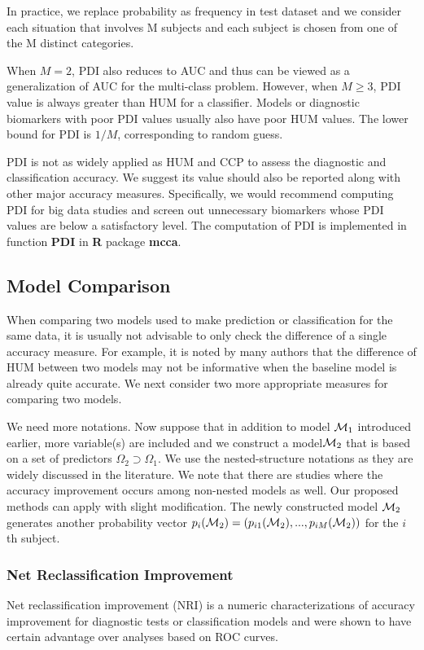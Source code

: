 \documentclass[]{article}
\begin{document}
In practice, we replace probability as frequency in test dataset and we consider each situation that involves M subjects
and each subject is chosen from one of the M distinct categories.

When $M=2$, PDI also reduces to AUC and thus can be viewed as a generalization of AUC for the multi-class problem. However, when $M\ge 3$, PDI value is always greater than HUM for a classifier. Models or diagnostic biomarkers with poor PDI values usually also have poor HUM values. The lower bound for PDI is $1/M$, corresponding to random guess. 

PDI is not as widely applied as HUM and CCP to assess the diagnostic and classification accuracy. We suggest its value should also be reported along with other major accuracy measures. Specifically, we would recommend computing PDI for big data studies and screen out unnecessary biomarkers whose PDI values are below a satisfactory level.  The computation of PDI is implemented in function \textbf{PDI} in \textbf{R} package \textbf{mcca}.
\subsection{Model Comparison}
When comparing two models used to make prediction or classification for the same data, it is usually not advisable to only check the difference of a single accuracy measure. For example, it is noted by many authors that the difference of HUM between two models may not be informative when the baseline model is already quite accurate. We next consider two more appropriate measures for comparing two models. 

We need more notations. Now suppose that in addition to model ${\cal M}_1$ introduced earlier, more variable(s) are included and we construct a model\textit{${\cal M}_2 $} that is based on a set of predictors $ \Omega_2 \supset \Omega_1$. We use the nested-structure notations as they are widely discussed in the literature. We note that there are studies where the accuracy improvement occurs among non-nested models as well. Our proposed methods can apply with slight modification. The newly constructed model \textit{$ {\cal M}_2 $} generates another probability vector $ p_i({\cal M}_2)=(p_{i1}({\cal M}_2),...,p_{iM}({\cal M}_2)) $ for the $i$th subject.
\subsubsection{Net Reclassification Improvement}
Net reclassification improvement (NRI) \cite{pencina2011extensions} is a numeric characterizations of accuracy improvement for diagnostic tests or classification models and were shown to have certain advantage over analyses based on ROC curves.
\end{document}
